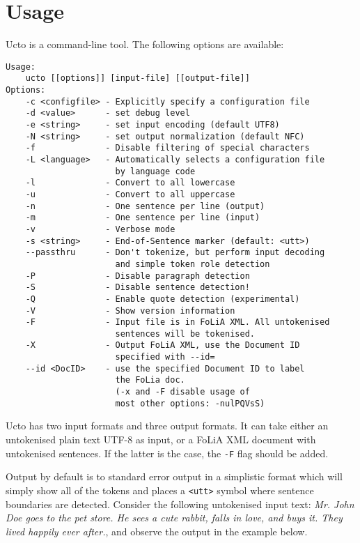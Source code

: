 \documentclass[a4paper,12pt]{report}
\begin{document}
\chapter{Usage}
\label{usage}

Ucto is a command-line tool. The following options are available:

\begin{verbatim}
Usage: 
	ucto [[options]] [input-file] [[output-file]]
Options:
	-c <configfile> - Explicitly specify a configuration file
	-d <value>      - set debug level
	-e <string>     - set input encoding (default UTF8)
	-N <string>     - set output normalization (default NFC)
	-f              - Disable filtering of special characters
	-L <language>   - Automatically selects a configuration file 
	                  by language code
	-l              - Convert to all lowercase
	-u              - Convert to all uppercase
	-n              - One sentence per line (output)
	-m              - One sentence per line (input)
	-v              - Verbose mode
	-s <string>     - End-of-Sentence marker (default: <utt>)
	--passthru      - Don't tokenize, but perform input decoding 
	                  and simple token role detection
	-P              - Disable paragraph detection
	-S              - Disable sentence detection!
	-Q              - Enable quote detection (experimental)
	-V              - Show version information
	-F              - Input file is in FoLiA XML. All untokenised 
	                  sentences will be tokenised.
	-X              - Output FoLiA XML, use the Document ID 
	                  specified with --id=
	--id <DocID>    - use the specified Document ID to label
	                  the FoLia doc.
	                  (-x and -F disable usage of 
	                  most other options: -nulPQVsS)
\end{verbatim}


Ucto has two input formats and three output formats. It can take either an untokenised plain text UTF-8 as input, or a FoLiA XML document with untokenised sentences. If the latter is the case, the \texttt{-F} flag should be added. 

Output by default is to standard error output in a simplistic format which will simply show all of the tokens and places a \texttt{<utt>} symbol where sentence boundaries are detected. Consider the following untokenised input text: \emph{Mr. John Doe goes to the pet store. He sees a cute rabbit, falls in love, and buys it. They lived happily ever after.}, and observe the output in the example below.
\end{document}
